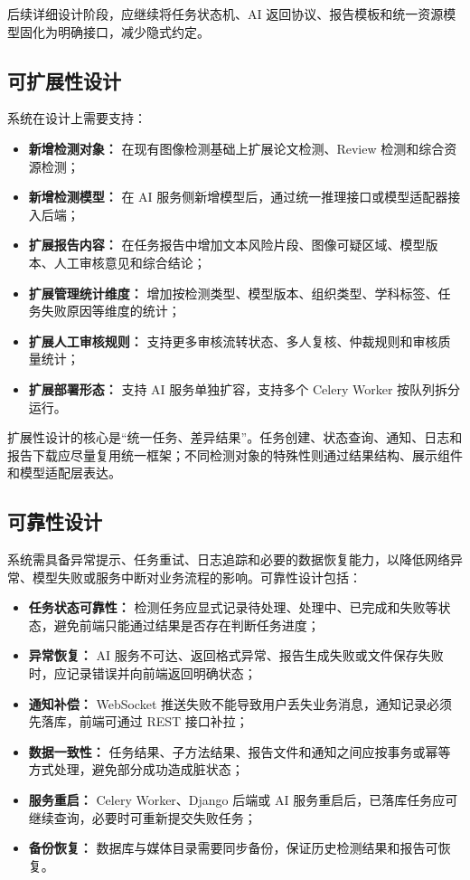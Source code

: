 后续详细设计阶段，应继续将任务状态机、AI 返回协议、报告模板和统一资源模型固化为明确接口，减少隐式约定。

\subsection{可扩展性设计}
系统在设计上需要支持：
\begin{itemize}[leftmargin=2em]
    \item \textbf{新增检测对象：} 在现有图像检测基础上扩展论文检测、Review 检测和综合资源检测；
    \item \textbf{新增检测模型：} 在 AI 服务侧新增模型后，通过统一推理接口或模型适配器接入后端；
    \item \textbf{扩展报告内容：} 在任务报告中增加文本风险片段、图像可疑区域、模型版本、人工审核意见和综合结论；
    \item \textbf{扩展管理统计维度：} 增加按检测类型、模型版本、组织类型、学科标签、任务失败原因等维度的统计；
    \item \textbf{扩展人工审核规则：} 支持更多审核流转状态、多人复核、仲裁规则和审核质量统计；
    \item \textbf{扩展部署形态：} 支持 AI 服务单独扩容，支持多个 Celery Worker 按队列拆分运行。
\end{itemize}

扩展性设计的核心是“统一任务、差异结果”。任务创建、状态查询、通知、日志和报告下载应尽量复用统一框架；不同检测对象的特殊性则通过结果结构、展示组件和模型适配层表达。

\subsection{可靠性设计}
系统需具备异常提示、任务重试、日志追踪和必要的数据恢复能力，以降低网络异常、模型失败或服务中断对业务流程的影响。可靠性设计包括：
\begin{itemize}[leftmargin=2em]
    \item \textbf{任务状态可靠性：} 检测任务应显式记录待处理、处理中、已完成和失败等状态，避免前端只能通过结果是否存在判断任务进度；
    \item \textbf{异常恢复：} AI 服务不可达、返回格式异常、报告生成失败或文件保存失败时，应记录错误并向前端返回明确状态；
    \item \textbf{通知补偿：} WebSocket 推送失败不能导致用户丢失业务消息，通知记录必须先落库，前端可通过 REST 接口补拉；
    \item \textbf{数据一致性：} 任务结果、子方法结果、报告文件和通知之间应按事务或幂等方式处理，避免部分成功造成脏状态；
    \item \textbf{服务重启：} Celery Worker、Django 后端或 AI 服务重启后，已落库任务应可继续查询，必要时可重新提交失败任务；
    \item \textbf{备份恢复：} 数据库与媒体目录需要同步备份，保证历史检测结果和报告可恢复。
\end{itemize}

